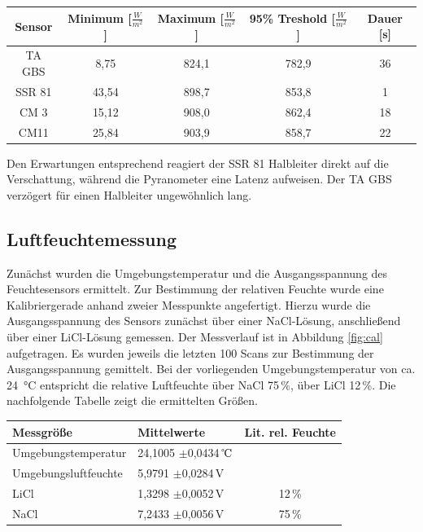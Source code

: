 \begin{center}
	\begin{tabular}{c|c|c|c|c}
		\label{tab:response}
		
		\textbf{Sensor} & \textbf{Minimum} [$\frac{W}{m^2}$] & \textbf{Maximum} [$\frac{W}{m^2}$]& \textbf{95\% Treshold} [$\frac{W}{m^2}$] & \textbf{Dauer} [s]\\
		\hline
		TA GBS & 8,75 & 824,1 & 782,9 & 36 \\
		SSR 81 & 43,54 & 898,7 & 853,8 & 1 \\
		CM 3 & 15,12 & 908,0 & 862,4 & 18 \\
		CM11 & 25,84 & 903,9 & 858,7 & 22 \\
	\end{tabular}
\end{center}
Den Erwartungen entsprechend reagiert der SSR 81 Halbleiter direkt auf die Verschattung, während die Pyranometer eine Latenz aufweisen. Der TA GBS verzögert für einen Halbleiter ungewöhnlich lang.

\subsection{Luftfeuchtemessung}
Zunächst wurden die Umgebungstemperatur und die Ausgangsspannung des Feuchtesensors ermittelt. Zur Bestimmung der relativen Feuchte wurde eine Kalibriergerade anhand zweier Messpunkte angefertigt. Hierzu wurde die Ausgangsspannung des Sensors zunächst über einer NaCl-Lösung, anschließend über einer LiCl-Lösung gemessen. Der Messverlauf ist in Abbildung \ref{fig:cal} aufgetragen. Es wurden jeweils die letzten 100 Scans zur Bestimmung der Ausgangsspannung gemittelt. Bei der vorliegenden Umgebungstemperatur von ca. \SI{24}{\celsius} entspricht die relative Luftfeuchte über NaCl 75\,\%, über LiCl 12\,\%. Die nachfolgende Tabelle zeigt die ermittelten Größen.
\begin{center}
	\begin{tabular}{l|l|c}
		\label{tab:amb}
		
		\textbf{Messgröße} & \textbf{Mittelwerte} & \textbf{Lit. rel. Feuchte}\\
		\hline
		Umgebungstemperatur & 24,1005 $\pm$0,0434\,$\celsius$ &\\
		Umgebungsluftfeuchte & 5,9791 $\pm$0,0284\,V & \\
		LiCl & 1,3298 $\pm$0,0052\,V & 12\,\%\\
		NaCl & 7,2433 $\pm$0,0056\,V & 75\,\%
	\end{tabular}
\end{center}



